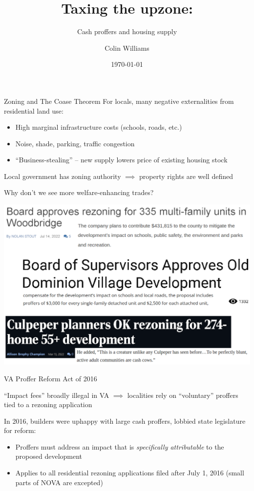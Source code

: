 \documentclass[10pt]{beamer}
\title{Taxing the upzone:}
\subtitle{Cash proffers and housing supply}
\date{\today}
\author{Colin Williams}
\institute{University of Virginia}
\begin{document}
\maketitle

\begin{frame}{Zoning and The Coase Theorem}
    For locals, many negative externalities from residential land use:
    \begin{itemize}
        \item High marginal infrastructure costs (schools, roads, etc.)
        \item Noise, shade, parking, traffic congestion
        \item ``Business-stealing'' -- new supply lowers price of existing housing stock
    \end{itemize}
    \vspace{2em}
    Local government has zoning authority $\implies$ property rights are well defined

    \vspace{2em}
    Why don't we see more welfare-enhancing trades?
\end{frame}


\begin{frame}
    \includegraphics[width=\textwidth]{figures/images/20230312 Rezoning News VA.png}
\end{frame}

\begin{frame}{VA Proffer Reform Act of 2016}

``Impact fees'' broadly illegal in VA $\implies$ localities rely on ``voluntary'' proffers tied to a rezoning application
\vspace{2em}

In 2016, builders were uphappy with large cash proffers, lobbied state legislature for reform:
\begin{itemize}
    \item Proffers must address an impact that is \textit{specifically attributable} to the proposed development
    \item Applies to all residential rezoning applications filed after July 1, 2016 (small parts of NOVA are excepted)
\end{itemize}
\end{frame}
\end{document}

